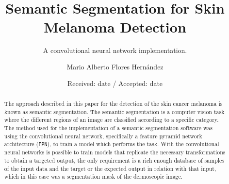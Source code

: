 %
%


\title{Semantic Segmentation for Skin Melanoma Detection%
}
\subtitle{A convolutional neural network implementation.}


\author{Mario Alberto Flores Hernández}


\date{Received: date / Accepted: date}


\maketitle

\begin{abstract}
  The approach described in this paper for the detection of the skin cancer melanoma is known as semantic segmentation. The semantic segmentation is a computer vision task where the different regions of an image are classified according to a specific category. The method used for the implementation of a semantic segmentation software was using the convolutional neural network, specifically a feature pyramid network architecture (\texttt{FPN}), to train a model which performs the task. With the convolutional neural networks is possible to train models that replicate the necessary transformations to obtain a targeted output, the only requirement is a rich enough database of samples of the input data and the target or the expected output in relation with that input, which in this case was a segmentation mask of the dermoscopic image.

\end{abstract}

